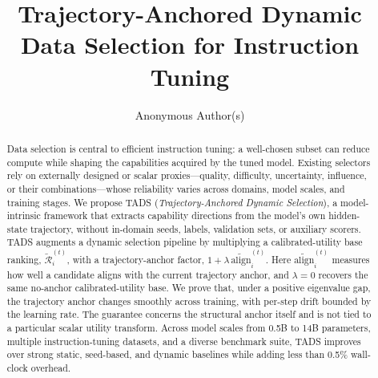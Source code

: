 \documentclass[sigconf,anonymous,review]{acmart}
\begin{document}
\title{Trajectory-Anchored Dynamic Data Selection for
       Instruction Tuning}

\author{Anonymous Author(s)}

\begin{abstract}
Data selection is central to efficient instruction tuning: a
well-chosen subset can reduce compute while shaping the capabilities
acquired by the tuned model. Existing selectors rely on externally
designed or scalar proxies---quality, difficulty, uncertainty,
influence, or their combinations---whose reliability varies across
domains, model scales, and training stages. We propose \textsc{TADS}
(\textit{Trajectory-Anchored Dynamic Selection}), a model-intrinsic
framework that extracts capability directions from the model's own
hidden-state trajectory, without in-domain seeds, labels, validation
sets, or auxiliary scorers. \textsc{TADS} augments a dynamic
selection pipeline by multiplying a calibrated-utility base
ranking, $\tilde{\mathcal{R}}_i^{(t)}$, with a trajectory-anchor
factor, $1+\lambda\,\widetilde{\mathrm{align}}_i^{(t)}$. Here
$\widetilde{\mathrm{align}}_i^{(t)}$ measures how well a candidate
aligns with the current trajectory anchor, and $\lambda=0$ recovers
the same no-anchor calibrated-utility base. We prove that, under a
positive eigenvalue gap, the trajectory anchor changes smoothly
across training, with per-step drift bounded by the learning rate.
The guarantee concerns the structural anchor itself and is not tied
to a particular scalar utility transform. Across model scales
from 0.5B to 14B parameters, multiple instruction-tuning datasets,
and a diverse benchmark suite, \textsc{TADS} improves over strong
static, seed-based, and dynamic baselines while adding less than
0.5\% wall-clock overhead.
\end{abstract}




\maketitle








\end{document}
